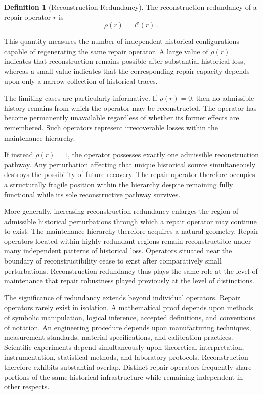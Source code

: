 \documentclass[12pt,oneside]{article}
\theoremstyle{plain}
\theoremstyle{definition}
\newtheorem{definition}[theorem]{Definition}
\theoremstyle{remark}
\theoremstyle{plain}
\begin{document}
\begin{definition}[Reconstruction Redundancy]
The reconstruction redundancy of a repair operator $r$ is
\[
\rho(r) = |\mathcal{C}(r)|.
\]
\end{definition}

This quantity measures the number of independent historical configurations capable of regenerating
the same repair operator. A large value of $\rho(r)$ indicates that reconstruction remains possible
after substantial historical loss, whereas a small value indicates that the corresponding repair
capacity depends upon only a narrow collection of historical traces.

The limiting cases are particularly informative. If $\rho(r) = 0$, then no admissible history
remains from which the operator may be reconstructed. The operator has become permanently
unavailable regardless of whether its former effects are remembered. Such operators represent
irrecoverable losses within the maintenance hierarchy.

If instead $\rho(r) = 1$, the operator possesses exactly one admissible reconstruction pathway.
Any perturbation affecting that unique historical source simultaneously destroys the possibility of
future recovery. The repair operator therefore occupies a structurally fragile position within the
hierarchy despite remaining fully functional while its sole reconstructive pathway survives.

More generally, increasing reconstruction redundancy enlarges the region of admissible historical
perturbations through which a repair operator may continue to exist. The maintenance hierarchy
therefore acquires a natural geometry. Repair operators located within highly redundant regions
remain reconstructible under many independent patterns of historical loss. Operators situated near
the boundary of reconstructibility cease to exist after comparatively small perturbations.
Reconstruction redundancy thus plays the same role at the level of maintenance that repair
robustness played previously at the level of distinctions.

The significance of redundancy extends beyond individual operators. Repair operators rarely exist
in isolation. A mathematical proof depends upon methods of symbolic manipulation, logical inference,
accepted definitions, and conventions of notation. An engineering procedure depends upon
manufacturing techniques, measurement standards, material specifications, and calibration practices.
Scientific experiments depend simultaneously upon theoretical interpretation, instrumentation,
statistical methods, and laboratory protocols. Reconstruction therefore exhibits substantial
overlap. Distinct repair operators frequently share portions of the same historical infrastructure
while remaining independent in other respects.
\end{document}
